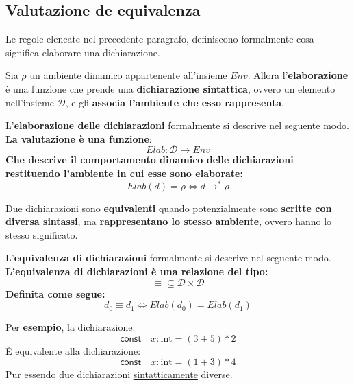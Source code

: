 \documentclass[a4paper]{article}
\begin{document}
	\subsection{Valutazione de equivalenza}
	
	Le regole elencate nel precedente paragrafo, definiscono formalmente cosa significa elaborare una dichiarazione.\newline
	
	\noindent
	Sia $\rho$ un ambiente dinamico appartenente all'insieme $Env$. Allora l'\textbf{elaborazione} è una funzione che prende una \textbf{dichiarazione sintattica}, ovvero un elemento nell'insieme $\mathcal{D}$, e gli \textbf{associa l'ambiente che esso rappresenta}.
	
	\begin{boxdef}
		L'\textcolor{Red3}{\textbf{elaborazione delle dichiarazioni}} formalmente si descrive nel seguente modo. \textbf{La valutazione è una funzione}:
		\begin{equation*}
			Elab: \mathcal{D} \longrightarrow Env
		\end{equation*}
		\textbf{Che descrive il comportamento dinamico delle dichiarazioni restituendo l'ambiente in cui esse sono elaborate:}
		\begin{equation*}
			Elab\left(d\right) = \rho \iff d \longrightarrow^{*} \rho
		\end{equation*}
	\end{boxdef}\:\newline

	\noindent
	Due dichiarazioni sono \textbf{equivalenti} quando potenzialmente sono \textbf{scritte con diversa sintassi}, ma \textbf{rappresentano lo stesso ambiente}, ovvero hanno lo stesso significato.
	
	\begin{boxdef}
		L'\textcolor{Red3}{\textbf{equivalenza di dichiarazioni}} formalmente si descrive nel seguente modo. \textbf{L'equivalenza di dichiarazioni è una relazione del tipo:}
		\begin{equation*}
			\equiv \subseteq \mathcal{D} \times \mathcal{D}
		\end{equation*}
		\textbf{Definita come segue:}
		\begin{equation*}
			d_{0} \equiv d_{1} \iff Elab\left(d_{0}\right) = Elab\left(d_{1}\right)
		\end{equation*}
	\end{boxdef}\:\newline
	
	\noindent
	Per \textcolor{Green4}{\textbf{esempio}}, la dichiarazione:
	\begin{equation*}
		\mathsf{const} \hspace{1em} x: \mathrm{int} = \left(3+5\right)*2
	\end{equation*}
	È equivalente alla dichiarazione:
	\begin{equation*}
		\mathsf{const} \hspace{1em} x: \mathrm{int} = \left(1+3\right)*4
	\end{equation*}
	Pur essendo due dichiarazioni \underline{sintatticamente} diverse.\newpage
	
\end{document}
